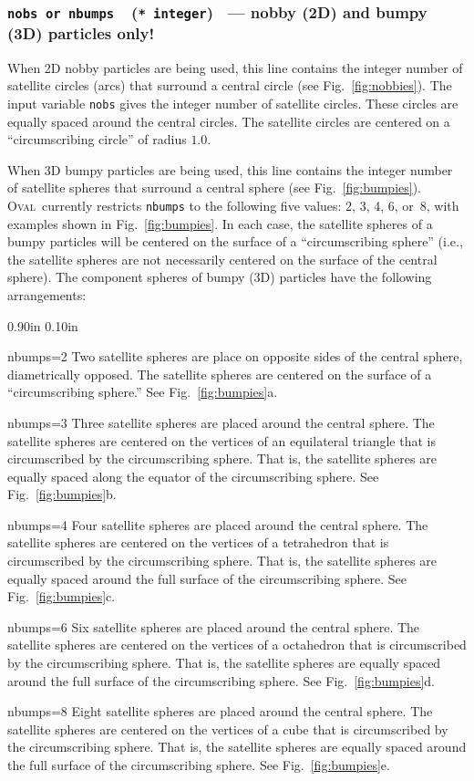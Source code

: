 \documentclass[letterpaper,11pt]{article}
\newcommand{\Oval}{\textsc{Oval}}
\newcommand{\Var}[2]{\texttt{#1}\ \  (\texttt{#2})}
\newlength{\Labelwidth}
\newcommand{\Entrylabel}[1]{\makebox[\Labelwidth][r]{\texttt{#1}}}
\newenvironment{Options}
{\begin{list}{}{%
\renewcommand{\makelabel}{\Entrylabel}%
\setlength{\leftmargin} {0.90in}%
\setlength{\rightmargin}{0.00in}%
\setlength{\labelsep}   {0.10in}%
\setlength{\labelwidth} {\Labelwidth}%
}}
{\end{list}}
\begin{document}
\subsubsection[\texttt{nobs} or \texttt{nbumps}]
              {\Var{nobs \textrm{or} nbumps}{* integer}%
              \ --- nobby (2D) and bumpy (3D)
              particles only!}\label{sec:nobs}
When 2D nobby particles are being used, this line contains the
integer number of satellite circles (arcs) that surround a central circle
(see Fig.~\ref{fig:nobbies}).
The input variable \texttt{nobs} gives the integer number of
satellite circles.  These circles are equally spaced around the
central circles.
The satellite circles are centered on a ``circumscribing circle''
of radius $1.0$.
\par
When 3D bumpy particles are being used, this line contains the
integer number of satellite spheres that surround a central sphere
(see Fig.~\ref{fig:bumpies}).
\Oval\ currently restricts \texttt{nbumps} to the following five values:
2, 3, 4, 6, or~8, with examples shown in Fig.~\ref{fig:bumpies}.
In each case, the satellite spheres of a bumpy particles will be centered
on the surface of a ``circumscribing sphere'' (i.e., the
satellite spheres are not necessarily centered on the surface of the
central sphere).
The component spheres of bumpy (3D) particles have the following
arrangements:
%
\begin{Options}
\item[nbumps=2]
Two satellite spheres are place on opposite sides of the central sphere,
diametrically opposed.
The satellite spheres are centered on the surface of a ``circumscribing
sphere.''  See Fig.~\ref{fig:bumpies}a.
\item[nbumps=3]
Three satellite spheres are placed around the central sphere.
The satellite spheres are centered on the vertices of an equilateral triangle
that is circumscribed by the circumscribing sphere.
That is, the satellite spheres are equally spaced along the equator
of the circumscribing sphere.
See Fig.~\ref{fig:bumpies}b.
\item[nbumps=4]
Four satellite spheres are placed around the central sphere.
The satellite spheres are centered on the vertices of a
tetrahedron that is circumscribed by the circumscribing sphere.
That is, the satellite spheres are equally spaced around the full surface
of the circumscribing sphere.
See Fig.~\ref{fig:bumpies}c.
\item[nbumps=6]
Six satellite spheres are placed around the central sphere.
The satellite spheres are centered on the vertices of a
octahedron that is circumscribed by the circumscribing sphere.
That is, the satellite spheres are equally spaced around the full surface
of the circumscribing sphere.
See Fig.~\ref{fig:bumpies}d.
\item[nbumps=8]
Eight satellite spheres are placed around the central sphere.
The satellite spheres are centered on the vertices of a
cube that is circumscribed by the circumscribing sphere.
That is, the satellite spheres are equally spaced around the full surface
of the circumscribing sphere.
See Fig.~\ref{fig:bumpies}e.
\end{Options}
\end{document}
